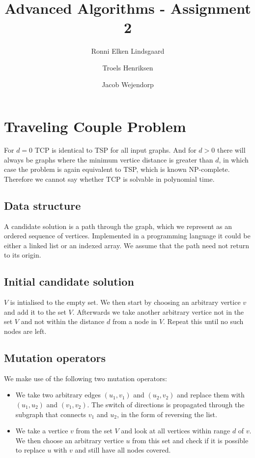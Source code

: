 \documentclass{article}
\title{Advanced Algorithms - Assignment 2}
\author{Ronni Elken Lindsgaard\and
Troels Henriksen\and
Jacob Wejendorp}
\begin{document}
\maketitle
\section{Traveling Couple Problem}
For $d=0$ TCP is identical to TSP for all input graphs. And for $d > 0$
there will always be graphs where the minimum vertice distance is
greater than $d$, in which case the problem is again equivalent to TSP, which
is known NP-complete. Therefore we cannot say whether TCP is solvable in
polynomial time.

\subsection{Data structure}

A candidate solution is a path through the graph, which we represent
as an ordered sequence of vertices.  Implemented in a programming
language it could be either a linked list or an indexed array.  We
assume that the path need not return to its origin.

\subsection{Initial candidate solution}

$V$ is intialised to the empty set. We then start by choosing an
arbitrary vertice $v$ and add it to the set $V$.  Afterwards we take
another arbitrary vertice not in the set $V$ and not within the
distance $d$ from a node in $V$.  Repeat this until no such nodes are
left.

\subsection{Mutation operators}

We make use of the following two mutation operators:

\begin{itemize}
\item We take two arbitrary edges $(u_1,v_1)$ and $(u_2,v_2)$ and
  replace them with $(u_1,u_2)$ and $(v_1,v_2)$. The switch of
  directions is propagated through the subgraph that connects $v_1$
  and $u_2$, in the form of reversing the list.
\item We take a vertice $v$ from the set $V$ and look at all vertices
  within range $d$ of $v$. We then choose an arbitrary vertice $u$
  from this set and check if it is possible to replace $u$ with $v$
  and still have all nodes covered.
\end{itemize}
\end{document}
